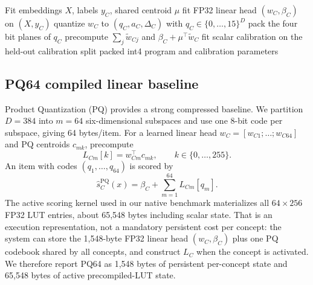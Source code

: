 \begin{algorithm}[t]
\caption{Compile a centered-binary semantic predicate}
\label{alg:binary_compile}
\begin{algorithmic}[1]
\Require Fit embeddings $X$, labels $y_C$, shared centroid $\mu$
\State fit FP32 linear head $(w_C,\beta_C)$ on $(X,y_C)$
\State quantize $w_C$ to $(q_C,a_C,\Delta_C)$ with $q_C\in\{0,\ldots,15\}^D$
\State pack the four bit planes of $q_C$
\State precompute $\sum_j\widetilde w_{Cj}$ and $\beta_C+\mu^\top\widetilde w_C$
\State fit scalar calibration on the held-out calibration split
\State \Return packed int4 program and calibration parameters
\end{algorithmic}
\end{algorithm}

\subsection{PQ64 compiled linear baseline}
Product Quantization (PQ) \citep{jegou2011pq} provides a strong compressed baseline. We partition $D=384$ into $m=64$ six-dimensional subspaces and use one 8-bit code per subspace, giving 64 bytes/item. For a learned linear head $w_C=[w_{C1};\ldots;w_{C64}]$ and PQ centroids $c_{mk}$, precompute
\begin{equation}
L_{Cm}[k]=w_{Cm}^\top c_{mk},\qquad k\in\{0,\ldots,255\}.
\end{equation}
An item with codes $(q_1,\ldots,q_{64})$ is scored by
\begin{equation}
\widehat s_C^{\mathrm{PQ}}(x)=\beta_C+\sum_{m=1}^{64}L_{Cm}[q_m].
\label{eq:pq_compiled}
\end{equation}
The active scoring kernel used in our native benchmark materializes all $64\times256$ FP32 LUT entries, about 65,548 bytes including scalar state. That is an execution representation, not a mandatory persistent cost per concept: the system can store the 1,548-byte FP32 linear head $(w_C,\beta_C)$ plus one PQ codebook shared by all concepts, and construct $L_C$ when the concept is activated. We therefore report PQ64 as 1,548 bytes of persistent per-concept state and 65,548 bytes of active precompiled-LUT state.

